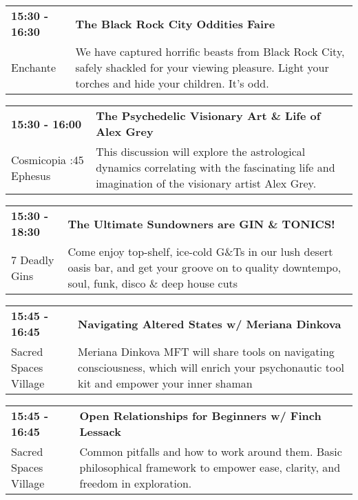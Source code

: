 \begin{tabular}{ p{1in} p{2.2in} }
    \textbf{15:30 - 16:30} & \textbf{The Black Rock City Oddities Faire} \\
    Enchante \newline  & We have captured horrific beasts from Black Rock City, safely shackled for your viewing pleasure. Light your torches and hide your children. It's odd. \\
    \hline 
\end{tabular}
    
\begin{tabular}{ p{1in} p{2.2in} }
    \textbf{15:30 - 16:00} & \textbf{The Psychedelic Visionary Art \& Life of Alex Grey} \\
    Cosmicopia \newline 3:45 Ephesus & This discussion will explore the astrological dynamics correlating with the fascinating life and imagination of the visionary artist Alex Grey. \\
    \hline 
\end{tabular}
    
\begin{tabular}{ p{1in} p{2.2in} }
    \textbf{15:30 - 18:30} & \textbf{The Ultimate Sundowners are GIN \& TONICS!} \\
    7 Deadly Gins \newline  & Come enjoy top-shelf, ice-cold G\&Ts in our lush desert oasis bar, and get your groove on to quality downtempo, soul, funk, disco \& deep house cuts \\
    \hline 
\end{tabular}
    
\begin{tabular}{ p{1in} p{2.2in} }
    \textbf{15:45 - 16:45} & \textbf{Navigating Altered States w/ Meriana Dinkova} \\
    Sacred Spaces Village \newline  & Meriana Dinkova MFT will share tools on navigating consciousness, which will enrich your psychonautic tool kit and empower your inner shaman \\
    \hline 
\end{tabular}
    
\begin{tabular}{ p{1in} p{2.2in} }
    \textbf{15:45 - 16:45} & \textbf{Open Relationships for Beginners w/ Finch Lessack} \\
    Sacred Spaces Village \newline  & Common pitfalls and how to work around them. Basic philosophical framework to empower ease, clarity, and freedom in exploration. \\
    \hline 
\end{tabular}
    
